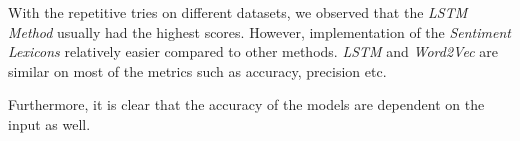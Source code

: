 \documentclass[11pt,a4paper]{article}
\begin{document}
With the repetitive tries on different datasets, we observed that the \textit{LSTM Method} usually had the highest scores. However, implementation of the \textit{Sentiment Lexicons} relatively easier compared to other methods. \textit{LSTM} and \textit{Word2Vec} are similar on most of the metrics such as accuracy, precision etc.

Furthermore, it is clear that the accuracy of the models are dependent on the input as well. 


\end{document}
